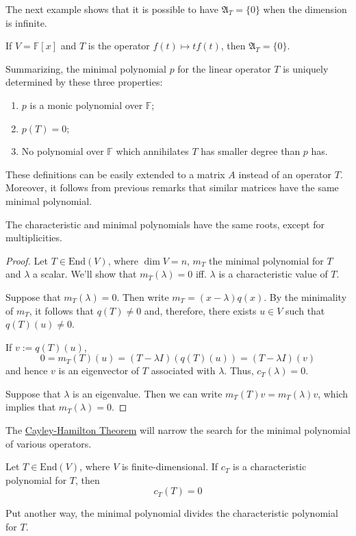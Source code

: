 The next example shows that it is possible to have $\mathfrak{A}_T = \{ 0 \}$ when the dimension is infinite.

\begin{example}
	If $V = \mathbb{F}[x]$ and $T$ is the operator $f(t) \mapsto tf(t)$, then $\mathfrak{A}_T = \{ 0 \}$.
\end{example}

Summarizing, the minimal polynomial $p$ for the linear operator $T$ is uniquely determined by these three properties:
\begin{enumerate}
	\item $p$ is a monic polynomial over $\mathbb{F}$;
	\item $p(T) = 0$;
	\item No polynomial over $\mathbb{F}$ which annihilates $T$ has smaller degree than $p$ has.
\end{enumerate}

These definitions can be easily extended to a matrix $A$ instead of an operator $T$. Moreover, it follows from previous remarks that similar matrices have the same minimal polynomial.

\begin{theorem}
	The characteristic and minimal polynomials have the same roots, except for multiplicities.
\end{theorem}

\begin{proof}
	Let $T \in \text{End}(V)$, where $\dim V = n$, $m_T$ the minimal polynomial for $T$ and $\lambda$ a scalar. We'll show that $m_T(\lambda) = 0$ iff. $\lambda$ is a characteristic value of $T$.

	Suppose that $m_T(\lambda) = 0$. Then write $m_T = (x-\lambda)q(x)$. By the minimality of $m_T$, it follows that $q(T) \neq 0$ and, therefore, there exists $u \in V$ such that $q(T)(u) \neq 0$.
	
	If $v := q(T)(u)$,
	\[
		0 = m_T(T)(u) = (T - \lambda I)(q(T)(u)) = (T - \lambda I)(v)
	\]
	and hence $v$ is an eigenvector of $T$ associated with $\lambda$. Thus, $c_T(\lambda) = 0$.

	Suppose that $\lambda$ is an eigenvalue. Then we can write $m_T(T)v = m_T(\lambda)v$, which implies that $m_T(\lambda) = 0$.
\end{proof}

The \hyperref[thm:cayley-hamilton]{Cayley-Hamilton Theorem} will narrow the search for the minimal polynomial of various operators.

\begin{theorem}\label{thm:cayley-hamilton}
	Let $T \in \text{End}(V)$, where $V$ is finite-dimensional. If $c_T$ is a characteristic polynomial for $T$, then
	\[
		c_T(T) = 0
	\]

	Put another way, the minimal polynomial divides the characteristic polynomial for $T$.
\end{theorem}

